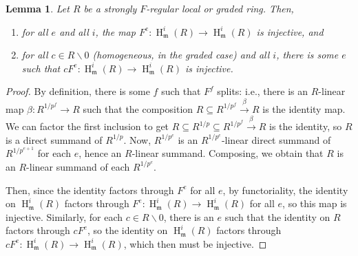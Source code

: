 \documentclass[11pt]{book}
\newtheorem{lemma}[theorem]{Lemma}
\numberwithin{equation}{section}
\numberwithin{theorem}{chapter}
\theoremstyle{definition}
\newtheorem*{basic properties}{Basic Properties}
\newtheorem*{Important Remark}{Important Remark}
\theoremstyle{remark}
\newcommand{\m}{\mathfrak{m}}
\renewcommand{\H}{\operatorname{H}}
\begin{document}
\begin{lemma}
	Let $R$ be a strongly $F$-regular  local or graded ring. Then,
	\begin{enumerate}
		\item for all $e$ and all $i$, the map $F^e:\H^i_\m(R)\to \H^i_\m(R)$ is injective, and
		\item for all $c\in R\smallsetminus 0$ (homogeneous, in the graded case) and all $i$, there is some $e$ such that $cF^e: \H^i_\m(R) \to \H^i_\m(R)$ is injective.
	\end{enumerate}
\end{lemma}
\begin{proof}
	By definition, there is some $f$ such that $F^f$ splits: i.e., there is an $R$-linear map $\beta:R^{1/p^f}\to R$ such that the composition $R \subseteq R^{1/p^f} \stackrel{\beta}{\longrightarrow} R$ is the identity map. We can factor the first inclusion to get $R \subseteq R^{1/p} \subseteq R^{1/p^f} \stackrel{\beta}{\longrightarrow} R$ is the identity, so $R$ is a direct summand of $R^{1/p}$. Now, $R^{1/p^e}$ is an $R^{1/p^e}$-linear direct summand of $R^{1/p^{e+1}}$ for each $e$, hence an $R$-linear summand. Composing, we obtain that $R$ is an $R$-linear summand of each $R^{1/p^e}$.
	
	Then, since the identity factors through $F^e$ for all $e$, by functoriality, the identity on $\H^i_\m(R)$ factors through $F^e:\H^i_\m(R)\to \H^i_\m(R)$ for all $e$, so this map is injective.
	Similarly, for each $c\in R\smallsetminus 0$, there is an $e$ such that the identity on $R$ factors through $cF^e$, so the identity on $\H^i_\m(R)$ factors through $cF^e: \H^i_\m(R) \to \H^i_\m(R)$, which then must be injective.
\end{proof}
\end{document}
